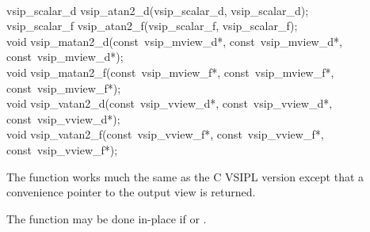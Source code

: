 \\\cvsiplh
\begin{cfuncs}
vsip\_scalar\_d vsip\_atan2\_d(vsip\_scalar\_d, vsip\_scalar\_d);\Bs\\
vsip\_scalar\_f vsip\_atan2\_f(vsip\_scalar\_f, vsip\_scalar\_f);\Bs\\
void vsip\_matan2\_d(const~vsip\_mview\_d*, const~vsip\_mview\_d*, const~vsip\_mview\_d*);\Bs\\
void vsip\_matan2\_f(const~vsip\_mview\_f*, const~vsip\_mview\_f*, const~vsip\_mview\_f*);\Bs\\
void vsip\_vatan2\_d(const~vsip\_vview\_d*, const~vsip\_vview\_d*, const~vsip\_vview\_d*);\Bs\\
void vsip\_vatan2\_f(const~vsip\_vview\_f*, const~vsip\_vview\_f*, const~vsip\_vview\_f*);\Bs\\
\end{cfuncs}
\pyjvsiph
{}
\begin{comments}
\item{The  function works much the same as the C VSIPL version except that a convenience pointer to the output view is returned. 
\item The  function may be done in-place if  or .}
\end{comments}